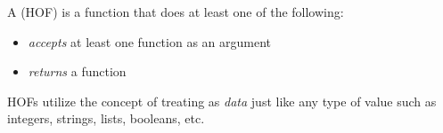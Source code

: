 A  (HOF) is a function that does at least one of the following:
\begin{itemize}
    \item \emph{accepts} at least one function as an argument
    \item \emph{returns} a function
\end{itemize}

HOFs utilize the concept of treating  as \emph{data} just like any type of value such as integers, strings, lists, booleans, etc. 

